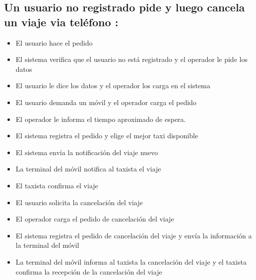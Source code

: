 \documentclass[a4paper]{article}
\begin{document}
\subsection{Un usuario no registrado pide y luego cancela un viaje via tel\'efono :}
\begin{itemize}
\item El usuario hace el pedido
\item El sistema verifica que el usuario no est\'a registrado y el operador le pide los datos
\item El usuario le dice los datos y el operador los carga en el sistema
\item El usuario demanda un m\'ovil y el operador carga el pedido
\item El operador le informa el tiempo aproximado de espera.
\item El sistema registra el pedido y elige el mejor taxi disponible
\item El sistema env\'ia la notificaci\'on del viaje nuevo
\item La terminal del m\'ovil notifica al taxista el viaje
\item El taxista confirma el viaje
\item El usuario solicita la cancelaci\'on del viaje
\item El operador carga el pedido de cancelaci\'on del viaje
\item El sistema registra el pedido de cancelaci\'on del viaje y env\'ia la informaci\'on a la terminal del m\'ovil
\item La terminal del m\'ovil informa al taxista la cancelaci\'on del viaje y el taxista confirma la recepci\'on de la cancelaci\'on del viaje
\end{itemize}
\end{document}

